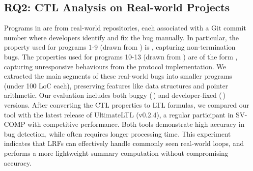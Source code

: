 \subsection{RQ2: CTL Analysis on  Real-world Projects}




Programs in  are from real-world repositories, each associated with a Git commit number where developers identify and fix the bug manually. 
In particular, the property used for programs 1-9 (drawn from \cite{DBLP:conf/sigsoft/ShiXLZCL22}) is  , capturing non-termination bugs. The properties used for programs 10-13 (drawn from \cite{DBLP:conf/icse/MengDLBR22}) are of the form , capturing unresponsive behaviours from the protocol implementation. 
We extracted the main segments of these real-world bugs into smaller programs (under 100 LoC each), preserving features like data structures and pointer arithmetic. Our evaluation includes both buggy (\,\xmark) and developer-fixed (\,\cmark) versions.
After converting the CTL properties to LTL formulas, we compared our tool with the latest release of UltimateLTL (v0.2.4), a regular participant in SV-COMP \cite{svcomp} with competitive performance. 
Both tools demonstrate high accuracy in bug detection, while \ultimateshort often requires longer processing time. 
This experiment indicates that LRFs can effectively handle commonly seen real-world loops, and \toolName performs a more lightweight summary computation without compromising accuracy. 










